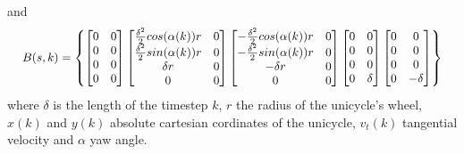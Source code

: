 \documentclass[twocolumn]{article}
\begin{document}
and 
\begin{equation*}%
    \resizebox{.99 \columnwidth}{!}{
    $B(s,k)=\begin{Bmatrix}
        \begin{bmatrix}
            0 & 0 \\
            0          & 0 \\
            0     & 0 \\
            0          & 0 \\
        \end{bmatrix}
        \begin{bmatrix}
            \frac{\delta^{2}}{2} cos(\alpha (k))r & 0 \\
            \frac{\delta^{2}}{2} sin(\alpha (k))r & 0 \\
            \delta r    & 0 \\
            0          & 0 \\
        \end{bmatrix}
        \begin{bmatrix}
            -\frac{\delta^{2}}{2} cos(\alpha (k))r & 0 \\
            -\frac{\delta^{2}}{2} sin(\alpha (k))r & 0 \\
            -\delta r    & 0 \\
            0          & 0 \\
        \end{bmatrix}
        \begin{bmatrix}
            0 & 0          \\
            0 & 0 \\
            0 & 0          \\
            0 & \delta     \\
        \end{bmatrix}
        \begin{bmatrix}
            0 & 0          \\
            0 & 0 \\
            0 & 0          \\
            0 & -\delta     \\
        \end{bmatrix}
    \end{Bmatrix} $ 
    }
\end{equation*}
where $\delta$ is the length of the timestep $k$, $r$ the radius of the unicycle's wheel, $x(k)$ and $y(k)$ absolute cartesian cordinates of the unicycle, 
$v_{t}(k)$ tangential velocity and $\alpha$ yaw angle.
\end{document}
